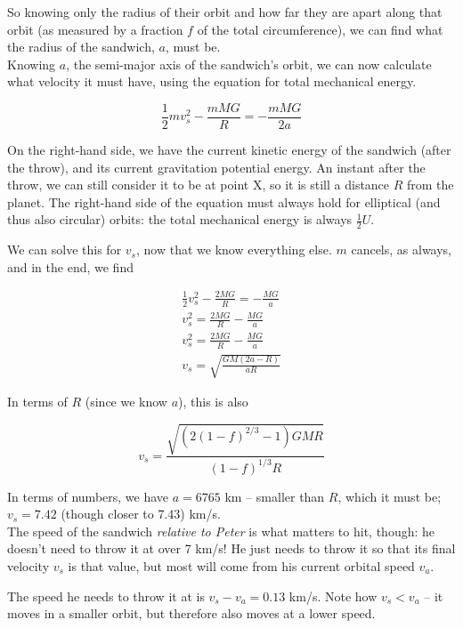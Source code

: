 So knowing only the radius of their orbit and how far they are apart along that orbit (as measured by a fraction $f$ of the total circumference), we can find what the radius of the sandwich, $a$, must be.\\
Knowing $a$, the semi-major axis of the sandwich's orbit, we can now calculate what velocity it must have, using the equation for total mechanical energy.

\begin{equation}
\frac{1}{2} m v_s^2 - \frac{m M G}{R} = -\frac{m M G}{2a}
\end{equation}

On the right-hand side, we have the current kinetic energy of the sandwich (after the throw), and its current gravitation potential energy. An instant after the throw, we can still consider it to be at point X, so it is still a distance $R$ from the planet. The right-hand side of the equation must always hold for elliptical (and thus also circular) orbits: the total mechanical energy is always $\displaystyle \frac{1}{2} U$.

We can solve this for $v_s$, now that we know everything else. $m$ cancels, as always, and in the end, we find

\begin{align}
\frac{1}{2} v_s^2 - \frac{2 M G}{R} = -\frac{M G}{a}\\
v_s^2 = \frac{2 M G}{R} - \frac{M G}{a}\\
v_s^2 = \frac{2 M G}{R} - \frac{M G}{a}\\
v_s = \sqrt{\frac{G M (2 a - R)}{a R}}
\end{align}

In terms of $R$ (since we know $a$), this is also

\begin{equation}
v_s = \frac{\sqrt{(2(1-f)^{2/3} - 1) G M R}}{(1 - f)^{1/3} R}
\end{equation}

In terms of numbers, we have $a = 6765$ km -- smaller than $R$, which it must be; $v_s = 7.42$ (though closer to 7.43) km/s.\\
The speed of the sandwich \emph{relative to Peter} is what matters to hit, though: he doesn't need to throw it at over 7 km/s! He just needs to throw it so that its final velocity $v_s$ is that value, but most will come from his current orbital speed $v_a$.

The speed he needs to throw it at is $v_s - v_a = 0.13$ km/s. Note how $v_s < v_a$ -- it moves in a smaller orbit, but therefore also moves at a lower speed.

